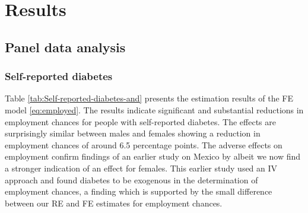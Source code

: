 \documentclass[12pt,english,british]{article}
\begin{document}
\section{\label{sec:RESULTS} Results}


\subsection{Panel data analysis}

\subsubsection*{Self-reported diabetes}

Table \ref{tab:Self-reported-diabetes-and} presents the estimation
results of the \ac{FE} model \ref{eq:employed}.
The results indicate significant and substantial reductions in employment
chances for people with self-reported diabetes. The effects are surprisingly similar between males and females showing a reduction in
employment chances of around 6.5 percentage points. The adverse effects on employment confirm findings of an earlier study on Mexico by \cite{Seuring2015} albeit we now find a stronger indication of an effect for females. This earlier study used an \ac{IV} approach and found diabetes to be exogenous in the determination of employment chances, a finding which is supported by the small difference between our \ac{RE} and \ac{FE} estimates for employment chances.
\end{document}
